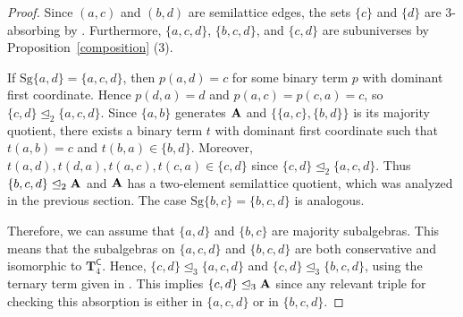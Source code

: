 \documentclass[11pt]{amsart}
\newcommand{\m}[1]{\mathbf{\uppercase{#1}}}
\newcommand{\co}{\scriptscriptstyle{\mathsf{C}}}
\theoremstyle{definition}
\theoremstyle{remark}
\theoremstyle{plain}
\def\T{\mathbf{T}}
\begin{document}
\begin{proof}
Since $(a,c)$ and $(b,d)$ are semilattice edges, the sets $\{c\}$ and $\{d\}$ are 3-absorbing by . Furthermore, $\{a,c,d\}$, $\{b,c,d\}$, and $\{c,d\}$ are subuniverses by Proposition~\ref{composition} (3). 

If $\mathrm{Sg}\{a,d\}=\{a,c,d\}$, then $p(a,d)=c$ for some binary term $p$ with dominant first coordinate. Hence $p(d,a)=d$ and $p(a,c)=p(c,a)=c$, so $\{c,d\}\trianglelefteq_2\{a,c,d\}$. Since $\{a,b\}$ generates $\m a$ and $\{\{a,c\},\{b,d\}\}$ is its majority quotient, there exists a binary term $t$ with dominant first coordinate such that $t(a,b)=c$ and $t(b,a)\in\{b,d\}$. Moreover, $t(a,d),t(d,a),t(a,c),t(c,a)\in\{c,d\}$ since $\{c,d\}\trianglelefteq_2\{a,c,d\}$. Thus $\{b,c,d\}\trianglelefteq_2\m a$ and $\m a$ has a two-element semilattice quotient, which was analyzed in the previous section. The case $\mathrm{Sg}\{b,c\}=\{b,c,d\}$ is analogous.

Therefore, we can assume that $\{a,d\}$ and $\{b,c\}$ are majority subalgebras. This means that the subalgebras on $\{a,c,d\}$ and $\{b,c,d\}$ are both conservative and isomorphic to $\T_4^{\co}$. Hence, $\{c,d\}\trianglelefteq_3\{a,c,d\}$ and $\{c,d\}\trianglelefteq_3\{b,c,d\}$, using the ternary term given in . This implies $\{c,d\}\trianglelefteq_3\m a$ since any relevant triple for checking this absorption is either in $\{a,c,d\}$ or in $\{b,c,d\}$.


\end{proof}
\end{document}

